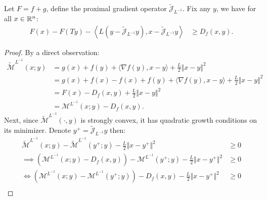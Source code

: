 \documentclass[12pt]{article}
\begin{document}
    \begin{theorem}
    \label{app:thm:fun-thm-prox-grad}
        Let $F = f + g$, define the proximal gradient operator $\widetilde{\mathcal J}_{L^{-1}}$.  
        Fix any $y$, we have for all $x \in \mathbb R^n$: 
        \begin{align*}
            F(x) - F(Ty) - 
            \left\langle 
                L(y - \widetilde{\mathcal J}_{L^{-1}} y),
                x - \widetilde {\mathcal J}_{L^{-1}}y
            \right\rangle
            &\ge  D_f(x, y) . 
        \end{align*}  
    \end{theorem}
    \begin{proof}
        By a direct observation: 
        \begin{align*}
            \widetilde{\mathcal M}^{L^{-1}}(x; y) 
            &= 
            g(x) + f(y) + \langle \nabla f(y), x - y\rangle + \frac{L}{2}\Vert x - y\Vert^2
            \\
            &= 
            g(x) + f(x) - f(x) + f(y) 
            + \langle \nabla f(y), x - y\rangle + \frac{L}{2}\Vert x - y\Vert^2
            \\
            &= 
            F(x) - D_f(x, y) + \frac{L}{2}\Vert x - y\Vert^2 
            \\
            &= \mathcal M^{L^{-1}}(x; y) - D_f(x, y). 
        \end{align*}
        Next, since $\widetilde{\mathcal M}^{L^{-1}}(\cdot, y)$ is strongly convex, it has quadratic growth conditions on its minimizer. 
        Denote $y^+ = \widetilde{\mathcal J}_{L^{-1}}y$ then: 
        {\small
        \begin{align*}
            \widetilde{\mathcal M}^{L^{-1}}(x; y) - 
            \widetilde{\mathcal M}^{L^{-1}}(y^+; y)
            - 
            \frac{L}{2}\Vert x - y^+\Vert^2
            &\ge 
            0
            \\
            \implies 
            \left(
                \mathcal M^{L^{-1}}(x; y) - D_f(x, y)
            \right) - 
            \mathcal M^{L^{-1}}(y^+; y) 
            - 
            \frac{L}{2}\Vert x - y^+\Vert^2
            &\ge 0
            \\
            \iff 
            \left(
                \mathcal M^{L^{-1}}(x; y)
                - 
                \mathcal M^{L^{-1}}(y^+; y)
            \right)
            - 
            D_f(x, y) 
            - \frac{L}{2}\Vert x - y^+\Vert^2
            &\ge 0
            \\

\end{align*}}
\end{proof}
\end{document}
